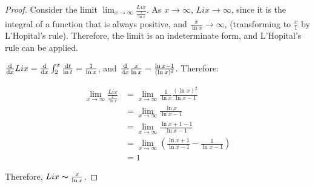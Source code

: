 \begin{proof}
  Consider the limit $\lim_{x \rightarrow \infty} \frac{Li x}{\frac{x}{\ln x}}$. As $x \rightarrow \infty$, $Li x \rightarrow \infty$, since it is the integral of a function that is always positive, and $\frac{x}{\ln x} \rightarrow \infty$, (transforming to $\frac{x}{1}$ by L'Hopital's rule). Therefore, the limit is an indeterminate form, and L'Hopital's rule can be applied.

  $\frac{\mathop{}\!\mathrm{d}}{\mathop{}\!\mathrm{d} x} Li x = \frac{\mathop{}\!\mathrm{d}}{\mathop{}\!\mathrm{d} x} \int_2^x \frac{\mathop{}\!\mathrm{d} t}{\ln t} = \frac{1}{\ln x}$, and $\frac{\mathop{}\!\mathrm{d}}{\mathop{}\!\mathrm{d} x} \frac{x}{\ln x} = \frac{\ln x - 1}{(\ln x)^2}$. Therefore:

  \begin{align*}
    \lim_{x \rightarrow \infty} \frac{Li x}{\frac{x}{\ln x}} &= \lim_{x \rightarrow \infty} \frac{1}{\ln x} \frac{(\ln x)^2}{\ln x - 1} \\
    &= \lim_{x \rightarrow \infty} \frac{\ln x}{\ln x - 1} \\
    &= \lim_{x \rightarrow \infty} \frac{\ln x + 1 - 1}{\ln x - 1} \\
    &= \lim_{x \rightarrow \infty} \left(\frac{\ln x + 1}{\ln x - 1} - \frac{1}{\ln x - 1}\right) \\
    &= 1
  \end{align*}

  Therefore, $Li x \thicksim \frac{x}{\ln x}$.
\end{proof}


